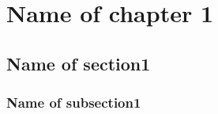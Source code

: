 \documentclass[12pt,a4paper]{memoir}
\begin{document}
\maketitle
\tableofcontents*

\chapter{Name of chapter 1}
\section{Name of section1}
\subsection{Name of subsection1}
\end{document}

